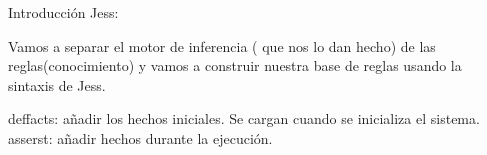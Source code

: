 \documentclass[11pt, a4paper, spanish, openright, twoside]{book}
\begin{document}
	\begin{section}{Introducción}
		Jess:


			Vamos a separar el motor de inferencia ( que nos lo dan hecho) de las reglas(conocimiento) y vamos a construir 					nuestra base de reglas usando la sintaxis de Jess.

			deffacts: añadir los hechos iniciales. Se cargan cuando se inicializa el sistema.
			asserst: añadir hechos durante la ejecución.
			



	\end{section}
\end{document}
